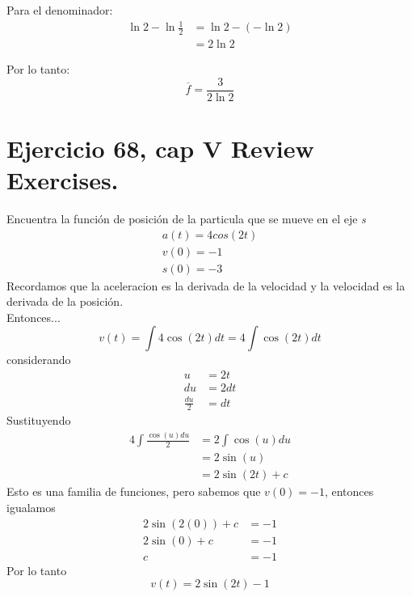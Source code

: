 \documentclass[11pt,letterpaper]{article}
\begin{document}
Para el denominador:
\begin{align*}
\ln 2-\ln \frac{1}{2} &= \ln 2-(-\ln 2) \\
&= 2\ln 2
\end{align*}

Por lo tanto:
$$\overline{f}=\frac{3}{2\ln 2}$$

\section{Ejercicio 68, cap V Review Exercises.}
Encuentra la función de posición de la particula que se mueve en el eje \textit{s}
\begin{equation*}
  \begin{split}
    a(t)=4cos(2t)\\
    v(0)=-1\\
    s(0)=-3
  \end{split}
\end{equation*}
Recordamos que la aceleracion es la derivada de la velocidad y la velocidad es la derivada de la posición.\\
Entonces...
\begin{equation*}
  v(t)=\int 4\cos(2t)dt = 4 \int \cos(2t)dt
\end{equation*}
considerando
\begin{equation*}
  \begin{split}
    u &= 2t\\
    du &= 2dt\\
    \frac{du}{2} &= dt
  \end{split}
\end{equation*}
Sustituyendo
\begin{equation*}
  \begin{split}
    4 \int \frac{\cos(u)du}{2} &= 2\int\cos(u)du\\
    &= 2\sin(u)\\
    &= 2\sin(2t)+c
  \end{split}
\end{equation*}
Esto es una familia de funciones, pero sabemos que $v(0)=-1$, entonces igualamos
\begin{equation*}
  \begin{split}
    2\sin(2(0))+c &= -1\\
    2\sin(0)+c &= -1\\
    c &= -1
  \end{split}
\end{equation*}
Por lo tanto
\begin{equation*}
  v(t)=2\sin(2t)-1
\end{equation*}
\end{document}
